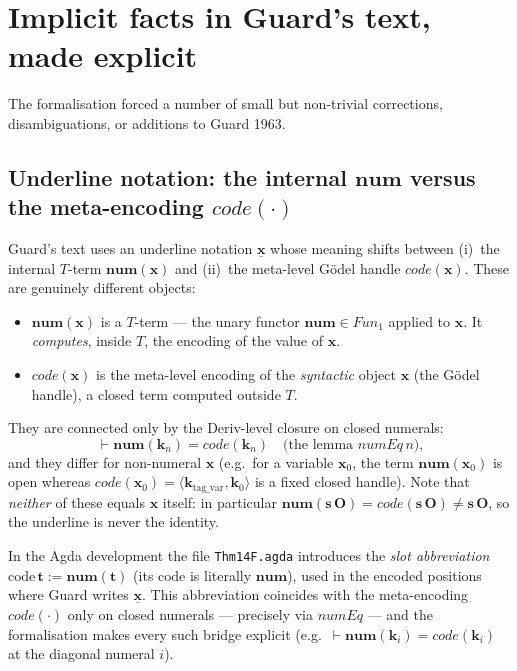 \documentclass[11pt]{article}
\theoremstyle{plain}
\theoremstyle{definition}
\theoremstyle{remark}
\newcommand{\code}[1]{\mathit{code}(#1)}
\newcommand{\num}{\mathbf{num}}
\newcommand{\seq}[1]{\langle #1 \rangle}
\newcommand{\Fun}{\mathit{Fun}}
\begin{document}
\section{Implicit facts in Guard's text, made explicit}

The formalisation forced a number of small but non-trivial corrections,
disambiguations, or additions to Guard 1963.

\subsection{Underline notation: the internal $\num$ versus the meta-encoding $\code{\cdot}$}

Guard's text uses an underline notation $\underline{\mathbf{x}}$ whose
meaning shifts between (i)~the internal $T$-term $\num(\mathbf{x})$
and (ii)~the meta-level G\"odel handle $\code{\mathbf{x}}$.  These are
genuinely different objects:
\begin{itemize}
\item $\num(\mathbf{x})$ is a $T$-term --- the unary functor $\num \in
\Fun_1$ applied to $\mathbf{x}$.  It \emph{computes}, inside $T$, the
encoding of the value of $\mathbf{x}$.
\item $\code{\mathbf{x}}$ is the meta-level encoding of the
\emph{syntactic} object $\mathbf{x}$ (the G\"odel handle), a closed
term computed outside $T$.
\end{itemize}
They are connected only by the Deriv-level closure on closed numerals:
\[
\vdash \num(\mathbf{k}_n) = \code{\mathbf{k}_n}
\quad\text{(the lemma $\mathit{numEq}\,n$),}
\]
and they differ for non-numeral $\mathbf{x}$ (e.g.\ for a variable
$\mathbf{x}_0$, the term $\num(\mathbf{x}_0)$ is open whereas
$\code{\mathbf{x}_0} = \seq{\mathbf{k}_{\mathrm{tag\_var}}, \mathbf{k}_0}$
is a fixed closed handle).  Note that \emph{neither} of these equals
$\mathbf{x}$ itself: in particular $\num(\mathbf{s}\,\mathbf{O}) =
\code{\mathbf{s}\,\mathbf{O}} \neq \mathbf{s}\,\mathbf{O}$, so the
underline is never the identity.

In the Agda development the file \verb|Thm14F.agda| introduces the
\emph{slot abbreviation} $\mathrm{code}\,\mathbf{t} := \num(\mathbf{t})$
(its $\mathrm{code}$ is literally $\num$), used in the encoded
positions where Guard writes $\underline{\mathbf{x}}$.  This
abbreviation coincides with the meta-encoding $\code{\cdot}$ only on
closed numerals --- precisely via $\mathit{numEq}$ --- and the
formalisation makes every such bridge explicit
(e.g.\ $\vdash \num(\mathbf{k}_i) = \code{\mathbf{k}_i}$ at the
diagonal numeral $i$).
\end{document}
